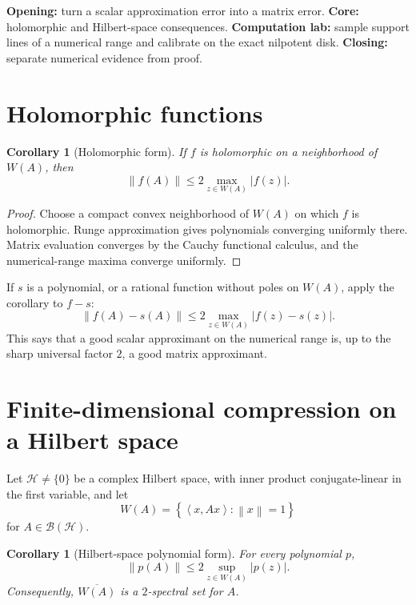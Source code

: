 \documentclass[11pt,oneside,openany]{book}
\newtheorem{corollary}[theorem]{Corollary}
\theoremstyle{definition}
\theoremstyle{remark}
\newcommand{\ip}[2]{\left\langle #1,#2\right\rangle}
\newcommand{\norm}[1]{\left\lVert #1\right\rVert}
\newcommand{\set}[1]{\left\{#1\right\}}
\begin{document}
\begin{workshopplan}
\textbf{Opening:} turn a scalar approximation error into a matrix
error. \textbf{Core:} holomorphic and Hilbert-space consequences.
\textbf{Computation lab:} sample support lines of a numerical range
and calibrate on the exact nilpotent disk.
\textbf{Closing:} separate numerical evidence from proof.
\end{workshopplan}

\section{Holomorphic functions}

\begin{corollary}[Holomorphic form]
\label{cor:holomorphic}
If \(f\) is holomorphic on a neighborhood of \(W(A)\), then
\[
  \norm{f(A)}
  \leq2\max_{z\in W(A)}|f(z)|.
\]
\end{corollary}

\begin{proof}
Choose a compact convex neighborhood of \(W(A)\) on which \(f\) is
holomorphic.  Runge approximation gives polynomials converging
uniformly there.  Matrix evaluation converges by the Cauchy functional
calculus, and the numerical-range maxima converge uniformly.
\end{proof}

If \(s\) is a polynomial, or a rational function without poles on
\(W(A)\), apply the corollary to \(f-s\):
\begin{equation}
  \norm{f(A)-s(A)}
  \leq2\max_{z\in W(A)}|f(z)-s(z)|.
  \label{eq:matrix-error}
\end{equation}
This says that a good scalar approximant on the numerical range is,
up to the sharp universal factor \(2\), a good matrix approximant.

\section{Finite-dimensional compression on a Hilbert space}

Let \(\mathcal H\neq\{0\}\) be a complex Hilbert space, with inner
product conjugate-linear in the first variable, and let
\[
  W(A)=\set{\ip{x}{Ax}:\norm{x}=1}
\]
for \(A\in\mathcal B(\mathcal H)\).

\begin{corollary}[Hilbert-space polynomial form]
\label{cor:hilbert}
For every polynomial \(p\),
\[
  \norm{p(A)}
  \leq2\sup_{z\in W(A)}|p(z)|.
\]
Consequently, \(\overline{W(A)}\) is a \(2\)-spectral set for \(A\).
\end{corollary}
\end{document}
